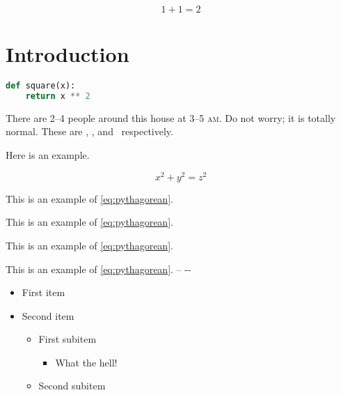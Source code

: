     \label{page:y}
    \begin{equation}
        1 + 1 = 2 \label{eq:a}
    \end{equation}

    \section{Introduction}
    \label{sec:intro}

    \lipsum[1]

\begin{lstlisting}[language=python,caption={A square function, obviously.}]
def square(x):
    return x ** 2
\end{lstlisting}

    \lipsum[2]

    There are 2--4 people around this house at 3--5 \textsc{am}.  Do not worry; it is totally normal. These are , , and \ respectively.

    Here is an example.

    \begin{equation}
        x^2 + y^2 = z^2  \label{eq:pythagorean}
    \end{equation}

    This is an example of \eqref{eq:pythagorean}. \lipsum[3]

    \begin{example}
        This is an example of \eqref{eq:pythagorean}.
    \end{example}

    \lipsum[4]

    \begin{example*}[likeme]
        This is an example of \eqref{eq:pythagorean}.
    \end{example*}

    \lipsum[5]
    \begin{note}
        This is an example of \eqref{eq:pythagorean}. \rsq\gsq\bsq\ysq -- {-}{-}
    \end{note}
    \lipsum[6]

    \begin{itemize}
        \item  First item
        \item  Second item
            \begin{itemize}
                \item  First subitem
                    \begin{itemize}
                        \item  What the hell!
                    \end{itemize}
                \item  Second subitem
            \end{itemize}
    \end{itemize}


